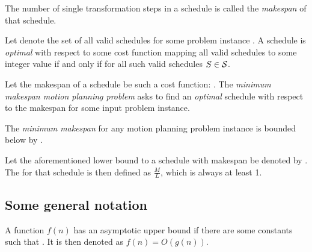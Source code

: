 \begin{definition}\label{def:makespan}
	The number of single transformation steps in a schedule is called the \emph{makespan} of that schedule.
\end{definition}

\begin{definition}\label{def:optimality}
	Let \ilmath{\schedules} denote the set of all valid schedules for some problem instance . 
	A schedule  is \emph{optimal} with respect to some cost function  mapping all valid schedules to some integer value if and only if  for all such valid schedules \(S \in \mathcal{S}\).
\end{definition}

\begin{definition}\label{def:m3pp}
	Let the makespan of a schedule be such a cost function: . 
	The \emph{minimum makespan motion planning problem} asks to find an \emph{optimal} schedule with respect to the makespan  for some input problem instance.
\end{definition}

\begin{remark}
	The \emph{minimum makespan} for any motion planning problem instance  is bounded below by .
\end{remark}

\begin{definition}
	Let the aforementioned lower bound to a schedule with makespan  be denoted by . 
	The  for that schedule is then defined as \(\frac{M}{L}\), which is always at least 1. 
\end{definition}

\subsection{Some general notation}

\begin{definition}
	A function \(f(n)\) has an asymptotic upper bound  if there are some constants  such that . 
	It is then denoted as \(f(n) = O(g(n))\). 
\end{definition}

